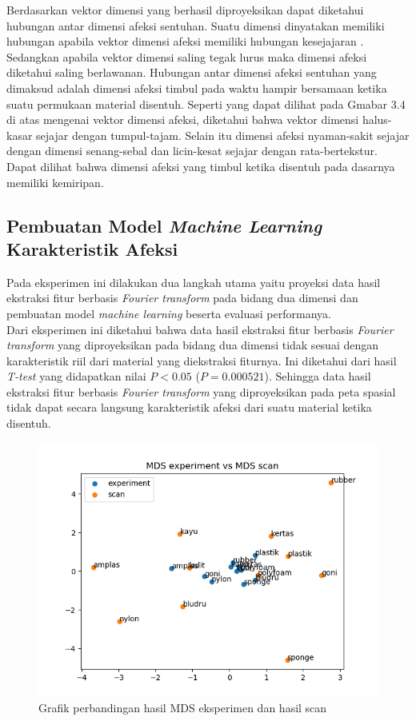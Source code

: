 \documentclass{Jurnal_kolo}
\begin{document}
\begin{multicols}{2}
	\indent Berdasarkan vektor dimensi yang berhasil diproyeksikan dapat diketahui hubungan antar dimensi afeksi sentuhan. Suatu dimensi dinyatakan memiliki hubungan apabila vektor dimensi afeksi memiliki hubungan kesejajaran \cite{Holliins1993}. Sedangkan apabila vektor dimensi saling tegak lurus maka dimensi afeksi diketahui saling berlawanan. Hubungan antar dimensi afeksi sentuhan yang dimaksud adalah dimensi afeksi timbul pada waktu hampir bersamaan ketika suatu permukaan material disentuh. Seperti yang dapat dilihat pada Gmabar 3.4 di atas mengenai vektor dimensi afeksi, diketahui bahwa vektor dimensi halus-kasar sejajar dengan tumpul-tajam. Selain itu dimensi afeksi nyaman-sakit sejajar dengan dimensi senang-sebal dan licin-kesat sejajar dengan rata-bertekstur. Dapat dilihat bahwa dimensi afeksi yang timbul ketika disentuh pada dasarnya memiliki kemiripan.

	\subsection{Pembuatan Model \emph{Machine Learning} Karakteristik Afeksi}
	\indent Pada eksperimen ini dilakukan dua langkah utama yaitu proyeksi data hasil ekstraksi fitur berbasis \emph{Fourier transform} pada bidang dua dimensi dan pembuatan model \emph{machine learning} beserta evaluasi performanya.\\ 
	\indent Dari eksperimen ini diketahui bahwa data hasil ekstraksi fitur berbasis \emph{Fourier transform} yang diproyeksikan pada bidang dua dimensi tidak sesuai dengan karakteristik riil dari material yang diekstraksi fiturnya. Ini diketahui dari hasil \emph{T-test} yang didapatkan nilai  $P<0.05$ ($P=0.000521$). Sehingga data hasil ekstraksi fitur berbasis \emph{Fourier transform} yang diproyeksikan pada peta spasial tidak dapat secara langsung karakteristik afeksi dari suatu material ketika disentuh. \\
	
	\begin{figure}[H]
		\centering
		\includegraphics[scale=0.5]{gambar/scanexp}
		\caption{Grafik perbandingan hasil MDS eksperimen dan hasil scan}
		\label{scanvsexp1}
	\end{figure}


\end{multicols}
\end{document}
